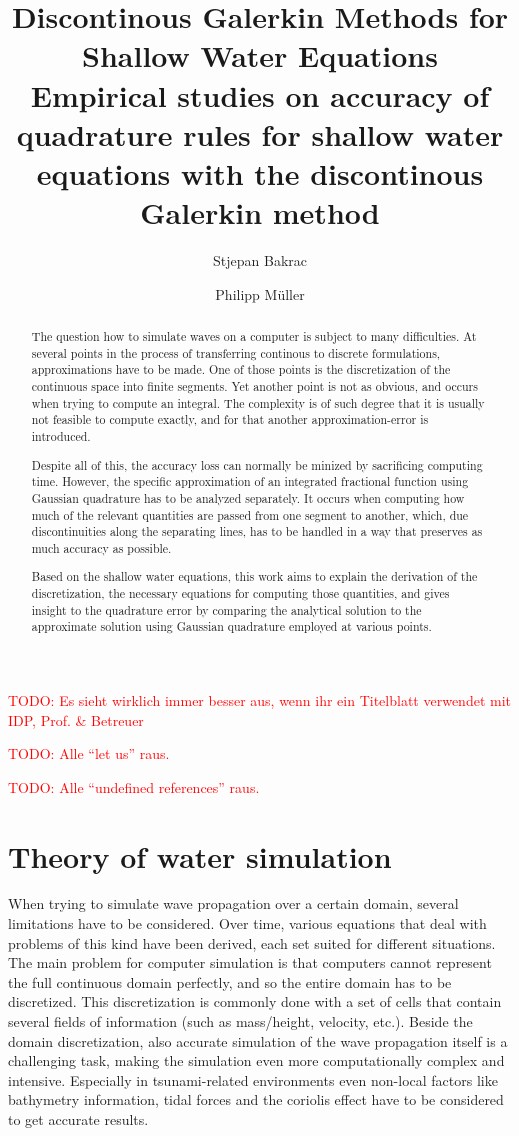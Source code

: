 \documentclass{article}
\title{Discontinous Galerkin Methods for Shallow Water Equations\\
  \vspace{.2cm}
\small{Empirical studies on accuracy of quadrature rules for shallow water equations with the discontinous Galerkin method}
}
\author{Stjepan Bakrac \and Philipp M\"uller}
\date{}
\newcommand{\todo}[2][]{\textcolor{red}{TODO\ifthenelse{\equal{#1}{}}{}{[#1]}: #2}}
\begin{document}
\todo{Es sieht wirklich immer besser aus, wenn ihr ein Titelblatt verwendet mit IDP, Prof. \& Betreuer}

\todo{Alle ``let us'' raus.}

\todo{Alle ``undefined references'' raus.}

\maketitle{}

\begin{abstract}
  The question how to simulate waves on a computer is subject to many difficulties. At several points in the process of transferring continous to discrete formulations, approximations have to be made.
One of those points is the discretization of the continuous space into finite segments.
Yet another point is not as obvious, and occurs when trying to compute an integral. The complexity is of such degree that it is usually not feasible to compute exactly, and for that another approximation-error is introduced.

Despite all of this, the accuracy loss can normally be minized by sacrificing computing time.
However, the specific approximation of an integrated fractional function using Gaussian quadrature has to be analyzed separately.
It occurs when computing how much of the relevant quantities are passed from one segment to another, which, due discontinuities along the separating lines, has to be handled in a way that preserves as much accuracy as possible.

Based on the shallow water equations, this work aims to explain the derivation of the discretization, the necessary equations for computing those quantities, and gives insight to the quadrature error by comparing the analytical solution to the approximate solution using Gaussian quadrature employed at various points.
\end{abstract}

\newpage
\setcounter{tocdepth}{2}
\tableofcontents{}

\newpage
\part{Theory of water simulation}
\label{part:introduction}

When trying to simulate wave propagation over a certain domain, several limitations have to be considered.
Over time, various equations that deal with problems of this kind have been derived, each set suited for different situations.
The main problem for computer simulation is that computers cannot represent the full continuous domain perfectly, and so the entire domain has to be discretized.
This discretization is commonly done with a set of cells that contain several fields of information (such as mass/height, velocity, etc.).
Beside the domain discretization, also accurate simulation of the wave propagation itself is a challenging task, making the simulation even more computationally complex and intensive.
Especially in tsunami-related environments even non-local factors like bathymetry information, tidal forces and the coriolis effect have to be considered to get accurate results.
\end{document}
